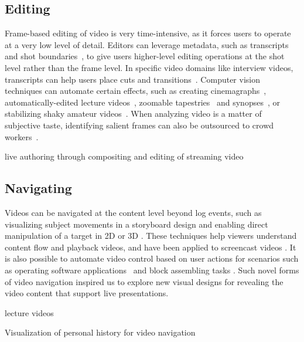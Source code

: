 \subsection{Editing}
Frame-based editing of video is very time-intensive, as it forces users to operate at a very low level of detail. Editors can leverage metadata, such as transcripts~\cite{Berthouzoz:2012,Pavel:2014:VDB:2642918.2647400} and shot boundaries~\cite{Casares:2002dx}, to give users higher-level editing operations at the shot level rather than the frame level.
In specific video domains like interview videos, transcripts can help users place cuts and transitions~\cite{Berthouzoz:2012}.
%
Computer vision techniques can automate certain effects, such as creating cinemagraphs~\cite{Bai:2012, Joshi:2012}, automatically-edited lecture videos~\cite{Heck:2007}, zoomable tapestries~\cite{Barnes:2010} and synopses~\cite{Pritch:2009vl}, or stabilizing shaky amateur videos~\cite{Liu:2011}. When analyzing video is a matter of subjective taste, identifying salient frames can also be outsourced to crowd workers~\cite{Bernstein:2011uj}.

live authoring through compositing and editing of streaming video~\cite{Freeman:2014:LLA:2611105.2557304}

\subsection{Navigating}
Videos can be navigated at the content level beyond log events, such as visualizing subject movements in a storyboard design \cite{goldman2006schematic} and enabling direct manipulation of a target in 2D \cite{Dragicevic:2008:VBD:1357054.1357096,Goldman:2008:VOA:1449715.1449719,Karrer:2008:DDM:1357054.1357097} or 3D \cite{Nguyen:2013:DMV:2470654.2466150}. These techniques help viewers understand content flow and playback videos, and have been applied to screencast videos \cite{Denoue:2013:RDM:2451176.2451190}. It is also possible to automate video control based on user actions for scenarios such as operating software applications~\cite{Pongnumkul:2011ju} and block assembling tasks \cite{Gupta:2012ku}. Such novel forms of video navigation inspired us to explore new visual designs for revealing the video content that support live presentations.

lecture videos~\cite{Tang:2006:DIU:1111449.1111523}

Visualization of personal history for video navigation~\cite{Al-Hajri:2014:VPH:2611105.2557106}

